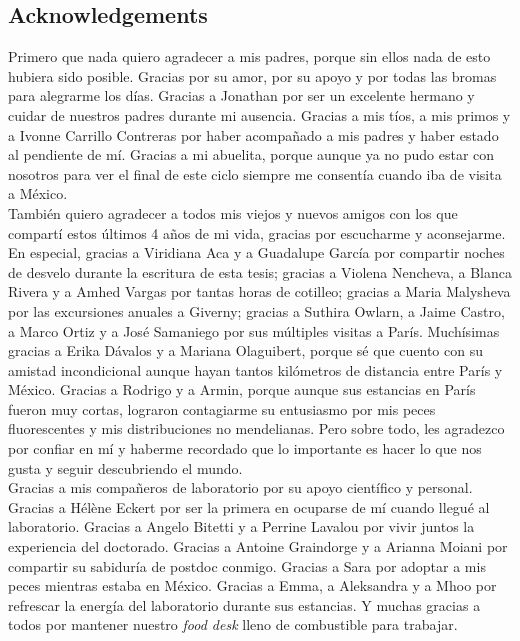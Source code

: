 \begin{center}
	\section*{Acknowledgements}
\end{center}

	Primero que nada quiero agradecer a mis padres, porque sin ellos nada de esto hubiera sido posible. Gracias por su amor, por su apoyo y por todas las bromas para alegrarme los d\'ias. Gracias a Jonathan por ser un excelente hermano y cuidar de nuestros padres durante mi ausencia. Gracias a mis t\'ios, a mis primos y a Ivonne Carrillo Contreras por haber acompa\~{n}ado a mis padres y haber estado al pendiente de m\'i. Gracias a mi abuelita, porque aunque ya no pudo estar con nosotros para ver el final de este ciclo siempre me consent\'ia cuando iba de visita a M\'exico.\\

	Tambi\'en quiero agradecer a todos mis viejos y nuevos amigos con los que compart\'i estos \'ultimos 4 a\~{n}os de mi vida, gracias por escucharme y aconsejarme. En especial, gracias a Viridiana Aca y a Guadalupe Garc\'ia por compartir noches de desvelo durante la escritura de esta tesis; gracias a Violena Nencheva, a Blanca Rivera y a Amhed Vargas por tantas horas de cotilleo; gracias a Maria Malysheva por las excursiones anuales a Giverny; gracias a Suthira Owlarn, a Jaime Castro, a Marco Ortiz y a Jos\'e Samaniego por sus m\'ultiples visitas a Par\'is. Much\'isimas gracias a Erika D\'avalos y a Mariana Olaguibert, porque s\'e que cuento con su amistad incondicional aunque hayan tantos kil\'ometros de distancia entre Par\'is y M\'exico. Gracias a Rodrigo y a Armin, porque aunque sus estancias en Par\'is fueron muy cortas, lograron contagiarme su entusiasmo por mis peces fluorescentes y mis distribuciones no mendelianas. Pero sobre todo, les agradezco por confiar en m\'i y haberme recordado que lo importante es hacer lo que nos gusta y seguir descubriendo el mundo.\\

	Gracias a mis compa\~{n}eros de laboratorio por su apoyo cient\'ifico y personal. Gracias a H\'el\`ene Eckert por ser la primera en ocuparse de m\'i cuando llegu\'e al laboratorio. Gracias a Angelo Bitetti y a Perrine Lavalou por vivir juntos la experiencia del doctorado. Gracias a Antoine Graindorge y a Arianna Moiani por compartir su sabidur\'ia de postdoc conmigo. Gracias a Sara por adoptar a mis peces mientras estaba en M\'exico. Gracias a Emma, a Aleksandra y a Mhoo por refrescar la energ\'ia del laboratorio durante sus estancias. Y muchas gracias a todos por mantener nuestro \textit{food desk} lleno de combustible para trabajar.\\

